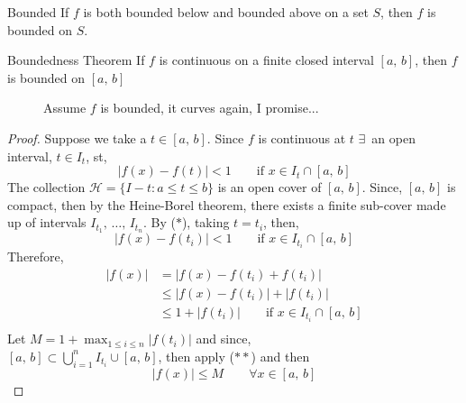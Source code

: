 \documentclass{article}
\newcommand{\sub}{\subset}
\renewcommand{\d}{\delta}
\newcommand{\e}{\varepsilon}
\newcommand{\ex}{\exists\,}
\begin{document}
{{{{\noindent\begin{definition}{Bounded}{}
  If $f$ is both bounded below and bounded above on a set $S$, then $f$ is bounded on $S$.
\end{definition}\vspace{10pt}
\begin{theorem}{Boundedness Theorem}{}
  If $f$ is continuous on a finite closed interval $[a,\, b]$, then $f$ is bounded on $[a,\,b]$
\end{theorem}
\begin{figure}[H]
  \centering
  \caption{Assume $f$ is bounded, it curves again, I promise...}
\end{figure}
\begin{proof}
  Suppose we take a $t\in[a,\,b]$. Since $f$ is continuous at $t $  $\ex $ an open interval, $t\in I_t$, st,
  \begin{equation*}
  |f(x) - f(t)|<1 \qquad\text{if $x\in I_t\cap[a,\,b]$}\tag{$*$}
\end{equation*}
  The collection $\displaystyle{\mathcal{H} = \{ I-t : a \le t \le b \}}$ is an open cover of $[a,\, b]$. Since, $[a,\, b]$ is compact, then by the Heine-Borel theorem, there exists a finite sub-cover made up of intervals $I_{t_1},\,\dots,\,I_{t_n}$. By ($*$), taking $t = t_i$, then,
  $$ |f(x) - f(t_i)|< 1 \qquad\text{if $x\in I_{t_i}\cap[a,\,b]$} $$
  Therefore,
  \begin{align*}
    |f(x)| &= |f(x) - f(t_i) + f(t_i)| \\
    &\le |f(x) - f(t_i)| + |f(t_i)| \\
    &\le 1 + |f(t_i)|\qquad \text{if $x\in I_{t_i}\cap[a,\,b]$} \tag{$**$}\\
  \end{align*}
Let $\displaystyle{M = 1 + \max_{1\le i\le n}{|f(t_i)|}}$ and since,\\ $\displaystyle{[a,\,b]\sub \bigcup_{i=1}^n{I_{t_i}\cup[a,\,b]}}$, then apply ($**$) and then
$$ |f(x)| \le M \qquad\forall x\in[a,\,b] $$
\end{proof}

}}}}
\end{document}
